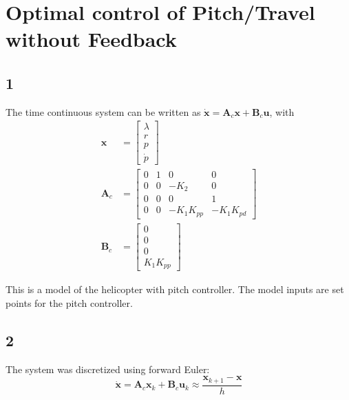 
\section{Optimal control of Pitch/Travel without Feedback}
\subsection{1}
The time continuous system can be written as $\mathbf{\dot{x}} = \mathbf{A}_c\mathbf{x}+ \mathbf{B}_c\mathbf{u}$, with
\begin{subequations}
    \begin{align}
        \mathbf{x} &= \begin{bmatrix}
            \lambda\\
            r\\
            p\\
            \dot{p}
        \end{bmatrix}\\
        \mathbf{A}_c &= \begin{bmatrix}
            0 & 1 & 0 & 0\\
            0 & 0 & -K_2 & 0\\
            0 & 0 & 0 & 1\\
            0 & 0& -K_1K_{pp} & -K_1K_{pd}
        \end{bmatrix} \\
        \mathbf{B}_c &= \begin{bmatrix}
            0\\
            0\\
            0\\
            K_1K_{pp}
        \end{bmatrix}
    \end{align}
\end{subequations}

This is a model of the helicopter with pitch controller. The model inputs are set points for the pitch controller. 

\subsection{2}
The system was discretized using forward Euler:
\begin{equation}
    \mathbf{\dot{x}} = \mathbf{A}_c\mathbf{x}_k + \mathbf{B}_c\mathbf{u}_k \approx \frac{\mathbf{x}_{k+1}-\mathbf{x}}{h}
\end{equation}

